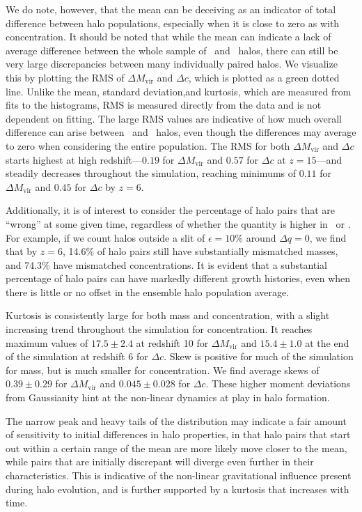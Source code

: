 We do note, however, that the mean can be deceiving as an indicator of total difference between halo populations, especially when it is close to zero as with concentration.  It should be noted that while the mean can indicate a lack of average difference between the whole sample of \lpt\ and \za\ halos, there can still be very large discrepancies between many individually paired halos.  We visualize this by plotting the RMS of $\Delta M_{\mathrm{vir}}$ and $\Delta c$, which is plotted as a green dotted line.  Unlike the mean, standard deviation,and kurtosis, which are measured from fits to the histograms, RMS is measured directly from the data and is not dependent on fitting.  The large RMS values are indicative of how much overall difference can arise between \lpt\ and \za\ halos, even though the differences may average to zero when considering the entire population.  The RMS for both $\Delta M_{\mathrm{vir}}$ and $\Delta c$ starts highest at high redshift---$0.19$ for $\Delta M_{\mathrm{vir}}$ and $0.57$ for $\Delta c$ at $z = 15$---and steadily decreases throughout the simulation, reaching minimums of $0.11$ for $\Delta M_{\mathrm{vir}}$ and $0.45$ for $\Delta c$ by $z = 6$.

Additionally, it is of interest to consider the percentage of halo pairs that are ``wrong'' at some given time, regardless of whether the quantity is higher in \lpt\ or \za.  For example, if we count halos outside a slit of $\epsilon = 10\%$ around $\Delta q = 0$, we find that by $z = 6$, 14.6\% of halo pairs still have substantially mismatched masses, and 74.3\% have mismatched concentrations.  It is evident that a substantial percentage of halo pairs can have markedly different growth histories, even when there is little or no offset in the ensemble halo population average.

Kurtosis is consistently large for both mass and concentration, with a slight increasing trend throughout the simulation for concentration.  It reaches maximum values of $17.5 \pm 2.4$ at redshift 10 for $\Delta M_{\mathrm{vir}}$ and $15.4 \pm 1.0$ at the end of the simulation at redshift 6 for $\Delta c$.  Skew is positive for much of the simulation for mass, but is much smaller for concentration.  We find average skews of $0.39 \pm 0.29$ for $\Delta M_{\mathrm{vir}}$ and $0.045 \pm 0.028$ for $\Delta c$.  These higher moment deviations from Gaussianity hint at the non-linear dynamics at play in halo formation.

The narrow peak and heavy tails of the distribution may indicate a fair amount of sensitivity to initial differences in halo properties, in that halo pairs that start out within a certain range of the mean are more likely move closer to the mean, while pairs that are initially discrepant will diverge even further in their characteristics.  This is indicative of the non-linear gravitational influence present during halo evolution, and is further supported by a kurtosis that increases with time.

